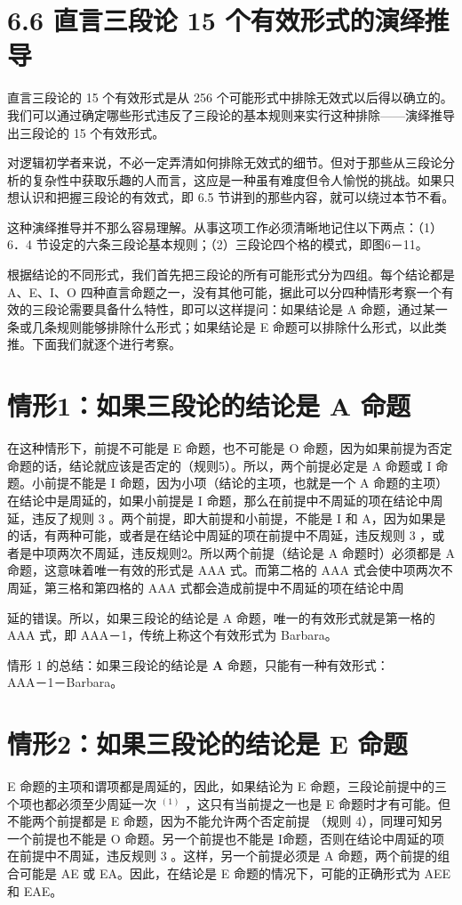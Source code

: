 \section*{6.6 直言三段论 15 个有效形式的演绎推导}
直言三段论的 15 个有效形式是从 256 个可能形式中排除无效式以后得以确立的。我们可以通过确定哪些形式违反了三段论的基本规则来实行这种排除——演绎推导出三段论的 15 个有效形式。

对逻辑初学者来说，不必一定弄清如何排除无效式的细节。但对于那些从三段论分析的复杂性中获取乐趣的人而言，这应是一种虽有难度但令人愉悦的挑战。如果只想认识和把握三段论的有效式，即 6.5 节讲到的那些内容，就可以绕过本节不看。

这种演绎推导并不那么容易理解。从事这项工作必须清晰地记住以下两点：（1）6．4 节设定的六条三段论基本规则；（2）三段论四个格的模式，即图6－11。

根据结论的不同形式，我们首先把三段论的所有可能形式分为四组。每个结论都是 A、E、I、O 四种直言命题之一，没有其他可能，据此可以分四种情形考察一个有效的三段论需要具备什么特性，即可以这样提问：如果结论是 A 命题，通过某一条或几条规则能够排除什么形式；如果结论是 E 命题可以排除什么形式，以此类推。下面我们就逐个进行考察。

\section*{情形1：如果三段论的结论是 $\mathbf{A}$ 命题}
在这种情形下，前提不可能是 E 命题，也不可能是 O 命题，因为如果前提为否定命题的话，结论就应该是否定的（规则5）。所以，两个前提必定是 A 命题或 I 命题。小前提不能是 I 命题，因为小项（结论的主项，也就是一个 A 命题的主项）在结论中是周延的，如果小前提是 I 命题，那么在前提中不周延的项在结论中周延，违反了规则 3 。两个前提，即大前提和小前提，不能是 I 和 A，因为如果是的话，有两种可能，或者是在结论中周延的项在前提中不周延，违反规则 3 ，或者是中项两次不周延，违反规则2。所以两个前提（结论是 A 命题时）必须都是 A 命题，这意味着唯一有效的形式是 AAA 式。而第二格的 AAA 式会使中项两次不周延，第三格和第四格的 AAA 式都会造成前提中不周延的项在结论中周

延的错误。所以，如果三段论的结论是 A 命题，唯一的有效形式就是第一格的 AAA 式，即 AAA－1，传统上称这个有效形式为 Barbara。

情形 1 的总结：如果三段论的结论是 $\mathbf{A}$ 命题，只能有一种有效形式：\\
AAA－1－Barbara。

\section*{情形2：如果三段论的结论是 $\mathbf{E}$ 命题}
E 命题的主项和谓项都是周延的，因此，如果结论为 E 命题，三段论前提中的三个项也都必须至少周延一次 ${ }^{(1)}$ ，这只有当前提之一也是 E 命题时才有可能。但不能两个前提都是 E 命题，因为不能允许两个否定前提 （规则 4），同理可知另一个前提也不能是 O 命题。另一个前提也不能是 I命题，否则在结论中周延的项在前提中不周延，违反规则 3 。这样，另一个前提必须是 A 命题，两个前提的组合可能是 AE 或 EA。因此，在结论是 E 命题的情况下，可能的正确形式为 AEE 和 EAE。

